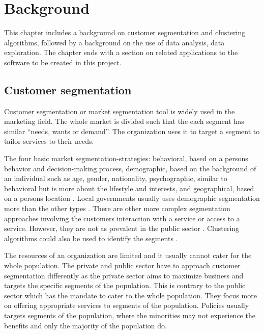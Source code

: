 \chapter{Background} \label{ch:background}
This chapter includes a background on customer segmentation and clustering algorithms, followed by a background on the use of data analysis, data exploration. The chapter ends with a section on related applications to the software to be created in this project.\par

\section{Customer segmentation}

Customer segmentation or market segmentation tool is widely used in the marketing field. The whole market is divided such that the each segment has similar ``needs, wants or demand''. The organization uses it to target a segment to tailor services to their needs.\par

The four basic market segmentation-strategies: behavioral, based on a person\textsc{}s behavior and decision-making process, demographic, based on the background of an individual such as age, gender, nationality, psychographic, similar to behavioral but is more about the lifestyle and interests, and geographical, based on a person\textsc{}s location \cite{marketing912017}. Local governments usually uses demographic segmentation more than the other types \cite{davey2009}. There are other more complex segmentation approaches involving the customer\textsc{}s interaction with a service or access to a service. However, they are not as prevalent in the public sector \cite{davey2009}. Clustering algorithms could also be used to identify the segments \cite{lgaguide}. \par

The resources of an organization are limited and it usually cannot cater for the whole population. The private and public sector have to approach customer segmentation differently as the private sector aims to maximize business and targets the specific segments of the population. This is contrary to the public sector which has the mandate to cater to the whole population. They focus more on offering appropriate services to segments of the population. Policies usually targets segments of the population, where the minorities may not experience the benefits and only the majority of the population do.\par

